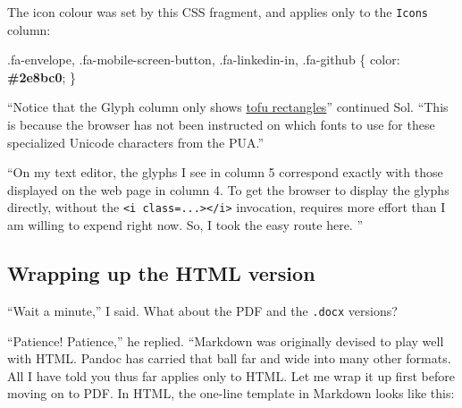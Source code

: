 \documentclass[
  british,
  a4paper,
  rgb,
  dvipsnames,
  svgnames,
  hyphens]{article}
\newenvironment{Shaded}{\begin{snugshade}}{\end{snugshade}}
\newcommand{\ConstantTok}[1]{\textcolor[rgb]{0.86,0.64,0.64}{\textbf{#1}}}
\newcommand{\FunctionTok}[1]{\textcolor[rgb]{0.94,0.94,0.56}{#1}}
\newcommand{\KeywordTok}[1]{\textcolor[rgb]{0.94,0.87,0.69}{#1}}
\newcommand{\NormalTok}[1]{\textcolor[rgb]{0.80,0.80,0.80}{#1}}
\newcommand{\OperatorTok}[1]{\textcolor[rgb]{0.94,0.94,0.82}{#1}}
\begin{document}
The icon colour was set by this CSS fragment, and applies only to the
\texttt{Icons} column:

\begin{Shaded}
\begin{Highlighting}[]
\FunctionTok{.fa{-}envelope}\OperatorTok{,} \FunctionTok{.fa{-}mobile{-}screen{-}button}\OperatorTok{,} \FunctionTok{.fa{-}linkedin{-}in}\OperatorTok{,} \FunctionTok{.fa{-}github}\NormalTok{ \{}
  \KeywordTok{color}\NormalTok{: }\ConstantTok{\#2e8bc0}\OperatorTok{;}
\NormalTok{\}}
\end{Highlighting}
\end{Shaded}

``Notice that the Glyph column only shows
\href{https://en.wikipedia.org/wiki/Noto_fonts\#Origin_of_Noto_name}{tofu
rectangles}'' continued Sol. ``This is because the browser has not been
instructed on which fonts to use for these specialized Unicode
characters from the PUA.''

``On my text editor, the glyphs I see in column 5 correspond exactly
with those displayed on the web page in column 4. To get the browser to
display the glyphs directly, without the
\texttt{\textless{}i\ class=...\textgreater{}\textless{}/i\textgreater{}}
invocation, requires more effort than I am willing to expend right now.
So, I took the easy route here.  \normalfont''

\hypertarget{wrapping-up-the-html-version}{%
\subsection{Wrapping up the HTML
version}\label{wrapping-up-the-html-version}}

``Wait a minute,'' I said. What about the PDF and the \texttt{.docx}
versions?

``Patience! Patience,'' he replied. ``Markdown was originally devised to
play well with HTML. Pandoc has carried that ball far and wide into many
other formats. All I have told you thus far applies only to HTML. Let me
wrap it up first before moving on to PDF. In HTML, the one-line template
in Markdown looks like this:
\end{document}
